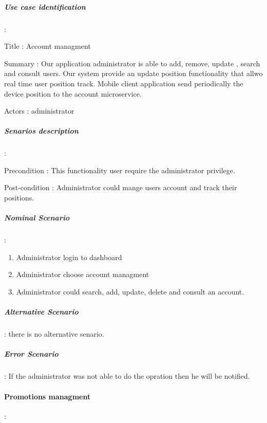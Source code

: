 \subparagraph{Use case identification} :
\label{sec:sec01} 

Title : Account managment

Summary : Our application administrator is able to add, remove, update , search and consult users. Our system provide
an update position functionality that allwo real time user position track. Mobile client application send periodically 
the device position to the account microservice.

Actors : administrator

\subparagraph{Senarios description} :
\label{sec:sec01}

Precondition : This functionality user require the administrator privilege.

Post-condition : Administrator could mange users account and track their positions.

\subparagraph{Nominal Scenario} :
\label{sec:sec01}

 \begin{enumerate}
   \item Administrator login to dashboard
   \item Administrator choose account managment
   \item Administrator could search, add, update, delete and consult an account.  
 \end{enumerate}

\subparagraph{Alternative Scenario} :
\label{sec:sec01}
there is no alternative senario.
\subparagraph{Error Scenario} :
\label{sec:sec01}
If the administrator was not able to do the opration then he will be notified.

 \paragraph{Promotions managment} :
\label{sec:sec01}   

